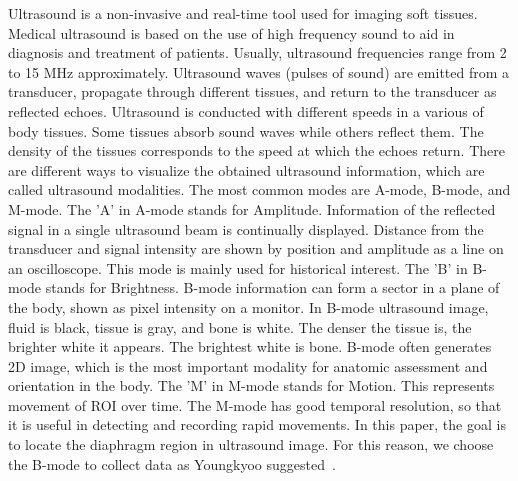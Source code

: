 Ultrasound is a non-invasive and real-time tool used for imaging soft tissues. Medical ultrasound is based on the use of high frequency sound to aid in diagnosis and treatment of patients. Usually, ultrasound frequencies range from 2 to 15 MHz approximately. Ultrasound waves (pulses of sound) are emitted from a transducer, propagate through different tissues, and return to the transducer as reflected echoes. Ultrasound is conducted with different speeds in a various of body tissues. Some tissues absorb sound waves while others reflect them. The density of the tissues corresponds to the speed at which the echoes return. There are different ways to visualize the obtained ultrasound information, which are called ultrasound modalities. The most common modes are A-mode, B-mode, and M-mode. The 'A' in A-mode stands for Amplitude. Information of the reflected signal in a single ultrasound beam is continually displayed. Distance from the transducer and signal intensity are shown by position and amplitude as a line on an oscilloscope. This mode is mainly used for historical interest. The 'B' in B-mode stands for Brightness. B-mode information can form a sector in a plane of the body, shown as pixel intensity on a monitor. In B-mode ultrasound image, fluid is black, tissue is gray, and bone is white. The denser the tissue is, the brighter white it appears. The brightest white is bone. B-mode often generates 2D image, which  is the most important modality for anatomic assessment and orientation in the body. The 'M' in M-mode stands for Motion. This represents movement of ROI over time. The M-mode has good temporal resolution, so that it is useful in detecting and recording rapid movements. In this paper, the goal is to locate the diaphragm region in ultrasound image. For this reason, we choose the B-mode to collect data as Youngkyoo suggested~\cite{hwang2012robust}.


